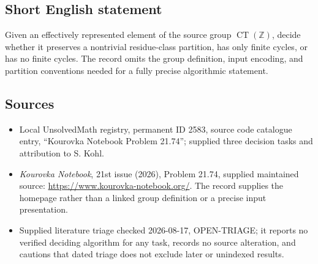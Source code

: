 \documentclass[11pt]{article}
\newcommand{\Z}{\mathbb{Z}}
\begin{document}
\subsection{Short English statement}
Given an effectively represented element of the source group $\operatorname{CT}(\Z)$, decide whether it preserves a nontrivial residue-class partition, has only finite cycles, or has no finite cycles. The record omits the group definition, input encoding, and partition conventions needed for a fully precise algorithmic statement.
\subsection{Sources}
\begin{itemize}
\item Local UnsolvedMath registry, permanent ID 2583, source code catalogue entry, ``Kourovka Notebook Problem 21.74''; supplied three decision tasks and attribution to S. Kohl.
\item \emph{Kourovka Notebook}, 21st issue (2026), Problem 21.74, supplied maintained source: \url{https://www.kourovka-notebook.org/}. The record supplies the homepage rather than a linked group definition or a precise input presentation.
\item Supplied literature triage checked 2026-08-17, OPEN-TRIAGE; it reports no verified deciding algorithm for any task, records no source alteration, and cautions that dated triage does not exclude later or unindexed results.
\end{itemize}
\end{document}
